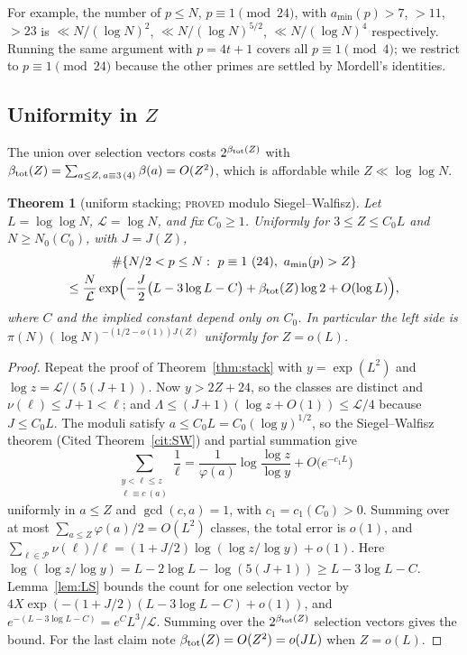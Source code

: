 \documentclass[11pt,reqno]{amsart}
\newtheorem{theorem}{Theorem}[section]
\theoremstyle{definition}
\newcommand{\amin}{a_{\min}}
\newcommand{\status}[1]{\textup{\textsc{#1}}}
\begin{document}
For example, the number of $p\le N$, $p\equiv1\pmod{24}$, with
$\amin(p)>7$, $>11$, $>23$ is $\ll N/(\log N)^{2}$,
$\ll N/(\log N)^{5/2}$, $\ll N/(\log N)^{4}$ respectively.  Running the
same argument with $p=4t+1$ covers all $p\equiv1\pmod4$; we restrict to
$p\equiv1\pmod{24}$ because the other primes are settled by Mordell's
identities.

\subsection{\texorpdfstring{Uniformity in $Z$}{Uniformity in Z}}

The union over selection vectors costs $2^{\beta_{\rm tot}(Z)}$ with
$\beta_{\rm tot}(Z)=\sum_{a\le Z,\,a\equiv3\,(4)}\beta(a)=O(Z^2)$, which
is affordable while $Z\ll\log\log N$.

\begin{theorem}[uniform stacking; \status{proved} modulo Siegel--Walfisz]\label{thm:uniform}
Let $L=\log\log N$, $\mathcal L=\log N$, and fix $C_0\ge1$.  Uniformly for
$3\le Z\le C_0L$ and $N\ge N_0(C_0)$, with $J=J(Z)$,
\begin{multline*}
 \#\{N/2<p\le N:\ p\equiv1\ (24),\ \amin(p)>Z\}\\
 \le\frac N{\mathcal L}\exp\Bigl(-\frac J2\bigl(L-3\log L-C\bigr)+\beta_{\rm tot}(Z)\log2+O(\log L)\Bigr),
\end{multline*}
where $C$ and the implied constant depend only on $C_0$.  In particular the
left side is $\pi(N)(\log N)^{-(1/2-o(1))J(Z)}$ uniformly for $Z=o(L)$.
\end{theorem}

\begin{proof}
Repeat the proof of Theorem~\ref{thm:stack} with $y=\exp(L^2)$ and
$\log z=\mathcal L/(5(J+1))$.  Now $y>2Z+24$, so the classes are distinct
and $\nu(\ell)\le J+1<\ell$; and $\Lambda\le(J+1)(\log z+O(1))\le\mathcal L/4$
because $J\le C_0L$.  The moduli satisfy $a\le C_0L=C_0(\log y)^{1/2}$, so
the Siegel--Walfisz theorem (Cited Theorem~\ref{cit:SW}) and partial summation give
\[
 \sum_{\substack{y<\ell\le z\\ \ell\equiv c\ (a)}}\frac1\ell
 =\frac1{\varphi(a)}\log\frac{\log z}{\log y}+O\bigl(e^{-c_1L}\bigr)
\]
uniformly in $a\le Z$ and $\gcd(c,a)=1$, with $c_1=c_1(C_0)>0$.  Summing over
at most $\sum_{a\le Z}\varphi(a)/2=O(L^2)$ classes, the total error is
$o(1)$, and
$\sum_{\ell\in\mathcal P}\nu(\ell)/\ell=(1+J/2)\log(\log z/\log y)+o(1)$.
Here $\log(\log z/\log y)=L-2\log L-\log(5(J+1))\ge L-3\log L-C$.  Lemma~\ref{lem:LS}
bounds the count for one selection vector by
$4X\exp(-(1+J/2)(L-3\log L-C)+o(1))$, and $e^{-(L-3\log L-C)}=e^{C}L^3/\mathcal L$.
Summing over the $2^{\beta_{\rm tot}(Z)}$ selection vectors gives the
bound.  For the last claim note $\beta_{\rm tot}(Z)=O(Z^2)=o(JL)$ when $Z=o(L)$.
\end{proof}
\end{document}
